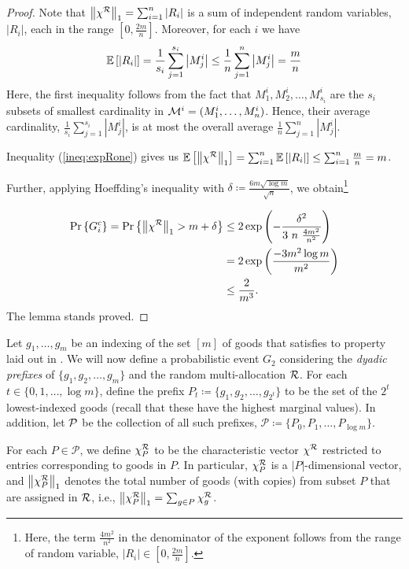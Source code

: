 \begin{proof} 
Note that $\left\|\chi^{\mathcal{R}}\right\|_1=\sum_{i=1}^n |R_i|$ is a sum of independent random variables, $|R_i|$, each in the range $\left[0,\frac{2m}{n}\right]$. Moreover, for each $i$ we have 
\begin{align}
    \mathbb{E}\left[|R_i|\right] = \frac{1}{s_i} \sum_{j=1}^{s_i} \left|M^i_j\right| \leq \frac{1}{n} \sum_{j=1}^{n} \left|M^i_j\right|=\frac{m}{n} \label{ineq:expRone}
\end{align}
Here, the first inequality follows from the fact that  $M^i_1, M^i_2, \ldots, M^i_{s_i}$ are the $s_i$ subsets of smallest cardinality in $\mathcal{M}^i=(M^i_1, \ldots, M^i_n)$. Hence, their average cardinality, $\frac{1}{s_i} \sum_{j=1}^{s_i} |M^i_j|$, is at most the overall average $\frac{1}{n} \sum_{j=1}^{n} |M^i_j|$. 

Inequality (\ref{ineq:expRone}) gives us $\mathbb{E}\left[\left\|\chi^{\mathcal{R}}\right\|_1\right] = \sum_{i =1}^n \mathbb{E}\left[|R_i|\right] \leq \sum_{i=1}^n \frac{m}{n}=m$. 

Further, applying Hoeffding's inequality with $\delta \coloneqq \frac{6m\sqrt{\log m}}{\sqrt{n}}$, we obtain\footnote{Here, the term $\frac{4m^2}{n^2}$ in the denominator of the exponent follows from the range of random variable, $|R_i| \in \left[0,\frac{2m}{n}\right]$.}

\begin{align*} \displaystyle \prob{G_i^c}=\prob{\ellone{\chi^\calR} > m + \delta} & \leq 2 \exp{\left(- \frac{\delta^2}{3 \ n \ \frac{4m^2}{n^2}}\right)} \\ & = 2 \exp{\left(\frac{-3 m^2 \log m}{m^2}\right)} \\ & \leq \frac{2}{m^3}. \end{align*}
The lemma stands proved. 
\end{proof}

Let $g_1, \dots, g_m$ be an indexing of the set $[m]$ of goods that satisfies to property laid out in . We will now define a probabilistic event $G_2$ considering the \textit{dyadic prefixes} of $\{g_1, g_2, \ldots, g_m\}$ and the random multi-allocation $\mathcal{R}$. For each $t\in\{0,1,\ldots,\log m\}$, define the prefix $P_t \coloneqq \{g_1,g_2,\ldots,g_{2^t} \}$ to be the set of the $2^t$ lowest-indexed goods (recall that these have the highest marginal values). In addition, let $\mathcal{P}$ be the collection of all such prefixes, $\mathcal{P} \coloneqq \{P_0,P_1,\dots,P_{\log m}\}$. 

For each $P\in \mathcal{P}$, we define $\chi^{\mathcal{R}}_P$ to be the characteristic vector $\chi^{\mathcal{R}}$ restricted to entries corresponding to goods in $P$. In particular, $\chi^{\mathcal{R}}_P$ is a $|P|$-dimensional vector, and $\left\|\chi^{\mathcal{R}}_P\right\|_1$ denotes the total number of goods (with copies) from subset $P$ that are assigned in $\mathcal{R}$, i.e., $\left\|\chi^{\mathcal{R}}_P\right\|_1 = \sum_{g \in P} \chi^{\mathcal{R}}_g$. 

